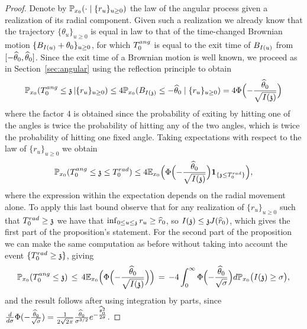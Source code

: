 \begin{proof}
Denote by $\mathbb{P}_{x_0}(\cdot\mid\{r_u\}_{u\geq0})$ the law of the angular process given a realization of its radial component. Given such a realization we already know that the trajectory $\{\theta_u\}_{u\geq0}$ is equal in law to that of the time-changed Brownian motion $\{B_{I(u)}+\theta_0\}_{u\geq0}$, for which $T^{ang}_0$ is equal to the exit time of $B_{I(u)}$ from $[-\widehat{\theta}_0,\widehat{\theta}_0]$. Since the exit time of a Brownian motion is well known, we proceed as in Section~\ref{sec:angular} using the reflection principle to obtain 
\[\mathbb{P}_{x_0}(T^{ang}_0\leq \mathfrak{z}\,|\{r_u\}_{u\geq0})\leq 4\mathbb{P}_{x_0}(B_{I(\mathfrak{z})}\leq -\widehat{\theta}_0\mid\{r_u\}_{u\geq 0})=4\Phi\Big({-}\frac{\widehat{\theta}_0}{\sqrt{I(\mathfrak{z})}}\Big)\]
where the factor 4 is obtained since the probability of exiting by hitting one of the angles is twice the probability of hitting any of the two angles, which is twice the probability of hitting one fixed angle. Taking expectations with respect to the law of $\{r_u\}_{u\geq 0}$ we obtain
\[\mathbb{P}_{x_0}(T^{ang}_0\leq \mathfrak{z}\leq T^{rad}_0)\leq 4\mathbb{E}_{x_0}\Big(\Phi\Big({-}\frac{\widehat{\theta}_0}{\sqrt{I(\mathfrak{z})}}\Big){\bf 1}_{\{\mathfrak{z}\leq T^{rad}_0\}}\Big),\]
where the expression within the expectation depends on the radial movement alone. To apply this last bound observe that for any realization of $\{r_u\}_{u\geq0}$ such that $T^{rad}_0\geq\mathfrak{z}$ we have that $\inf_{0\leq u\leq\mathfrak{z}}r_u\geq \widehat{r}_0$, so $I(\mathfrak{z})\leq \mathfrak{z}J(\widehat{r}_0)$, which gives the first part of the proposition's statement. For the second part of the proposition we can make the same computation as before without taking into account the event $\{T^{rad}_0\geq\mathfrak{z}\}$, giving 
\[\mathbb{P}_{x_0}(T^{ang}_0\leq \mathfrak{z})\,\leq\,4\mathbb{E}_{x_0}\Big(\Phi\Big({-}\frac{\widehat{\theta}_0}{\sqrt{I(\mathfrak{z})}}\Big)\Big)\,=\,-4\int_{0}^\infty\Phi\Big({-}\frac{\widehat{\theta}_0}{\sqrt{\sigma}}\Big)d\mathbb{P}_{x_0}\big(I(\mathfrak{z})\geq\sigma\big),\]
and the result follows after using integration by parts, since $\frac{d}{d\sigma}\Phi(-\frac{\widehat{\theta}_0}{\sqrt{\sigma}})=\frac{1}{2\sqrt{2\pi}}\frac{\widehat{\theta}_0}{\sigma^{3/2}}e^{-\frac{\widehat{\theta}_0^2}{2\sigma}}$.
 \end{proof}
 
 \smallskip
 

